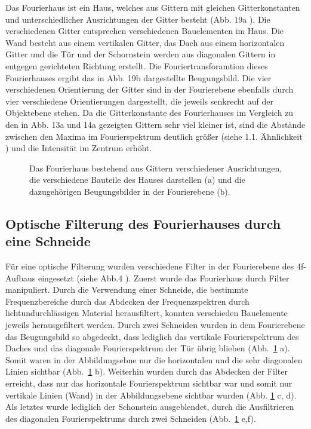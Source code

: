 Das Fourierhaus ist ein Haus, welches aus Gittern mit gleichen Gitterkonstanten und unterschiedlicher Ausrichtungen der Gitter besteht (Abb. 19a%
). Die verschiedenen Gitter entsprechen verschiedenen Bauelementen im Haus. Die Wand besteht aus einem vertikalen Gitter, das Dach aus einem horizontalen Gitter und die Tür und der Schornstein werden aus diagonalen Gittern in entgegen gerichteten Richtung erstellt. Die Fouriertransforamtion dieses
Fourierhauses ergibt das in Abb. 19b %
 dargestellte Beugungsbild. Die vier verschiedenen Orientierung der Gitter sind in der Fourierebene ebenfalls durch vier verschiedene Orientierungen dargestellt, die jeweils senkrecht auf der Objektebene stehen. Da die Gitterkonstante des Fourierhauses im Vergleich zu den in Abb. 13a und 14a gezeigten Gittern sehr viel kleiner ist, sind die Abstände zwischen den Maxima im Fourierspektrum deutlich größer (siehe 1.1. Ähnlichkeit%
 ) und die Intensität im Zentrum erhöht.

\begin{figure}[h]
	\centering
	\caption[Fourierhaus mit Fourierspektrum]{
		Das Fourierhaus   bestehend aus Gittern verschiedener Ausrichtungen, die 	verschiedene Bauteile des Hauses darstellen (a) und die dazugehörigen Beugungsbilder in der Fourierebene (b).
	}
	\label{fig:fourierhaus_und_spektrum}
\end{figure}

\subsection{Optische Filterung des Fourierhauses durch eine Schneide}

Für eine optische Filterung wurden verschiedene Filter in der Fourierebene des 4f-Aufbaus eingesetzt (siehe Abb.4%
). Zuerst wurde das Fourierhaus durch Filter manipuliert. Durch die Verwendung einer Schneide, die bestimmte Frequenzbereiche durch das Abdecken der Frequenzspektren durch lichtundurchlässigen Material herausfiltert, konnten verschieden Bauelemente jeweils herausgefiltert werden. Durch zwei Schneiden wurden in dem
Fourierebene das Beugungsbild so abgedeckt, dass lediglich das vertikale Fourierspektrum des Daches und das diagonale Fourierspektrum der Tür übrig blieben (Abb.~\ref{fig:fourierhaus_und_spektrum} a). Somit waren
in der Abbildungsebne nur die horizontalen und die sehr diagonalen Linien sichtbar (Abb.~\ref{fig:fourierhaus_und_spektrum} b). Weiterhin wurden durch das Abdecken der Filter erreicht, dass nur das horizontale Fourierspektrum sichtbar war und somit nur vertikale Linien (Wand) in der Abbildungsebene
sichtbar wurden (Abb. \ref{fig:fourierhaus_und_spektrum} c, d). Als letztes wurde lediglich der Schonstein ausgeblendet, durch die Ausfiltrieren des diagonalen Fourierspektrums durch zwei Schneiden (Abb.~\ref{fig:fourierhaus_und_spektrum} e,f).

